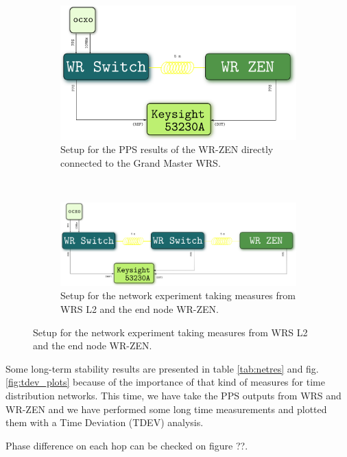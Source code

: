 \begin{figure}[H]
    \begin{subfigure}[t]{.35\textwidth}
        \centering
        \includegraphics[width=\textwidth]{img/prueba1_pps.png}
        \caption{Setup for the PPS results of the WR-ZEN directly connected to the Grand Master WRS.}
        \label{fig:prueba1_sch}
    \end{subfigure}
    ~
    \begin{subfigure}[t]{.60\textwidth}
        \centering
        \includegraphics[width=\textwidth]{img/prueba2-3_pps.png}
        \caption{Setup for the network experiment taking measures from WRS L2 and the end node WR-ZEN.}
        \label{fig:prueba2_sch}
    \end{subfigure}
\end{figure}

Some long-term stability results are presented in table \ref{tab:netres} and fig. \ref{fig:tdev_plots} because of the importance of that kind of measures for time distribution networks. This time, we have take the PPS outputs from WRS and WR-ZEN and we have performed some long time measurements and plotted them with a Time Deviation (TDEV) analysis. 

Phase difference on each hop can be checked on figure ??.

